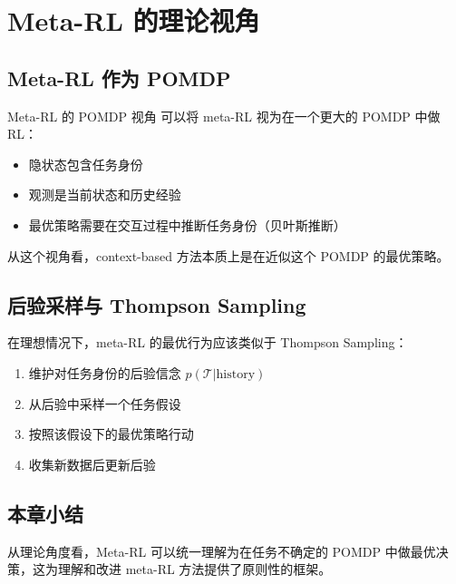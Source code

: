 \section{Meta-RL 的理论视角}

\subsection{Meta-RL 作为 POMDP}

\begin{importantbox}{Meta-RL 的 POMDP 视角}
可以将 meta-RL 视为在一个更大的 POMDP 中做 RL：
\begin{itemize}
    \item 隐状态包含任务身份
    \item 观测是当前状态和历史经验
    \item 最优策略需要在交互过程中推断任务身份（贝叶斯推断）
\end{itemize}
从这个视角看，context-based 方法本质上是在近似这个 POMDP 的最优策略。
\end{importantbox}

\subsection{后验采样与 Thompson Sampling}

在理想情况下，meta-RL 的最优行为应该类似于 Thompson Sampling：
\begin{enumerate}
    \item 维护对任务身份的后验信念 $p(\mathcal{T} | \text{history})$
    \item 从后验中采样一个任务假设
    \item 按照该假设下的最优策略行动
    \item 收集新数据后更新后验
\end{enumerate}

\subsection{本章小结}

从理论角度看，Meta-RL 可以统一理解为在任务不确定的 POMDP 中做最优决策，这为理解和改进 meta-RL 方法提供了原则性的框架。

